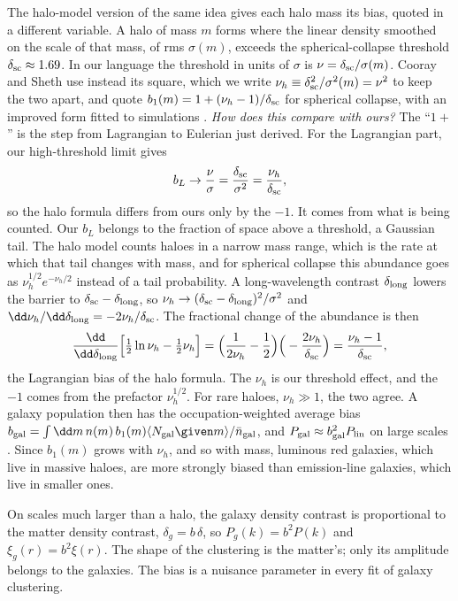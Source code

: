 The halo-model version of the same idea gives each halo mass its bias, quoted in a different variable. A halo of mass $m$ forms where the linear density smoothed on the scale of that mass, of rms $\sigma(m)$, exceeds the spherical-collapse threshold $\delta_{\rm sc}\approx1.69$. In our language the threshold in units of $\sigma$ is $\nu=\delta_{\rm sc}/\sigma(m)$. Cooray and Sheth use instead its square, which we write $\nu_h\equiv\delta_{\rm sc}^2/\sigma^2(m)=\nu^2$ to keep the two apart, and quote $b_1(m)=1+(\nu_h-1)/\delta_{\rm sc}$ for spherical collapse, with an improved form fitted to simulations \cite[eqs.~(53), (68)--(70)]{CooraySheth2002}. \emph{How does this compare with ours?} The ``$1+$'' is the step from Lagrangian to Eulerian just derived. For the Lagrangian part, our high-threshold limit gives
\[
  b_L\to\frac{\nu}{\sigma}=\frac{\delta_{\rm sc}}{\sigma^2}=\frac{\nu_h}{\delta_{\rm sc}} ,
\]
so the halo formula differs from ours only by the $-1$. It comes from what is being counted. Our $b_L$ belongs to the fraction of space above a threshold, a Gaussian tail. The halo model counts haloes in a narrow mass range, which is the rate at which that tail changes with mass, and for spherical collapse this abundance goes as $\nu_h^{1/2}e^{-\nu_h/2}$ instead of a tail probability. A long-wavelength contrast $\delta_{\rm long}$ lowers the barrier to $\delta_{\rm sc}-\delta_{\rm long}$, so $\nu_h\to(\delta_{\rm sc}-\delta_{\rm long})^2/\sigma^2$ and $\dd\nu_h/\dd\delta_{\rm long}=-2\nu_h/\delta_{\rm sc}$. The fractional change of the abundance is then
\[
  \frac{\dd}{\dd\delta_{\rm long}}\Big[\tfrac12\ln\nu_h-\tfrac12\nu_h\Big]
  =\Big(\frac{1}{2\nu_h}-\frac12\Big)\Big(-\frac{2\nu_h}{\delta_{\rm sc}}\Big)
  =\frac{\nu_h-1}{\delta_{\rm sc}} ,
\]
the Lagrangian bias of the halo formula. The $\nu_h$ is our threshold effect, and the $-1$ comes from the prefactor $\nu_h^{1/2}$. For rare haloes, $\nu_h\gg1$, the two agree. A galaxy population then has the occupation-weighted average bias $b_{\rm gal}=\int\dd m\,n(m)\,b_1(m)\langle N_{\rm gal}\given m\rangle/\bar n_{\rm gal}$, and $P_{\rm gal}\approx b_{\rm gal}^2P_{\rm lin}$ on large scales \cite[eqs.~(130)--(131)]{CooraySheth2002}. Since $b_1(m)$ grows with $\nu_h$, and so with mass, luminous red galaxies, which live in massive haloes, are more strongly biased than emission-line galaxies, which live in smaller ones.

\begin{keyidea}
On scales much larger than a halo, the galaxy density contrast is proportional to the matter density contrast, $\delta_g=b\,\delta$, so $P_g(k)=b^2P(k)$ and $\xi_g(r)=b^2\xi(r)$. The shape of the clustering is the matter's; only its amplitude belongs to the galaxies. The bias is a nuisance parameter in every fit of galaxy clustering.
\end{keyidea}

